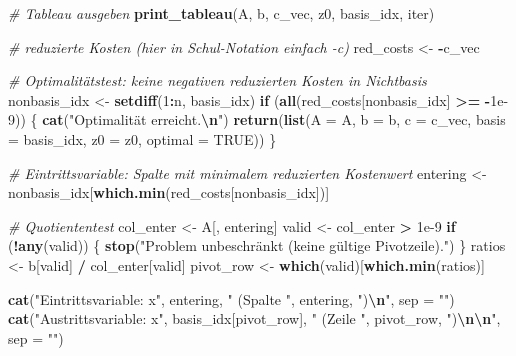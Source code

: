 \documentclass[
]{article}
\newenvironment{Shaded}{\begin{snugshade}}{\end{snugshade}}
\newcommand{\AttributeTok}[1]{\textcolor[rgb]{0.13,0.29,0.53}{#1}}
\newcommand{\CommentTok}[1]{\textcolor[rgb]{0.56,0.35,0.01}{\textit{#1}}}
\newcommand{\ConstantTok}[1]{\textcolor[rgb]{0.56,0.35,0.01}{#1}}
\newcommand{\ControlFlowTok}[1]{\textcolor[rgb]{0.13,0.29,0.53}{\textbf{#1}}}
\newcommand{\DecValTok}[1]{\textcolor[rgb]{0.00,0.00,0.81}{#1}}
\newcommand{\FloatTok}[1]{\textcolor[rgb]{0.00,0.00,0.81}{#1}}
\newcommand{\FunctionTok}[1]{\textcolor[rgb]{0.13,0.29,0.53}{\textbf{#1}}}
\newcommand{\NormalTok}[1]{#1}
\newcommand{\OtherTok}[1]{\textcolor[rgb]{0.56,0.35,0.01}{#1}}
\newcommand{\SpecialCharTok}[1]{\textcolor[rgb]{0.81,0.36,0.00}{\textbf{#1}}}
\newcommand{\StringTok}[1]{\textcolor[rgb]{0.31,0.60,0.02}{#1}}
\begin{document}
\begin{Shaded}
\begin{Highlighting}[]
  \CommentTok{\# Tableau ausgeben}
  \FunctionTok{print\_tableau}\NormalTok{(A, b, c\_vec, z0, basis\_idx, iter)}

  \CommentTok{\# reduzierte Kosten (hier in Schul{-}Notation einfach {-}c)}
\NormalTok{  red\_costs }\OtherTok{\textless{}{-}} \SpecialCharTok{{-}}\NormalTok{c\_vec}

  \CommentTok{\# Optimalitätstest: keine negativen reduzierten Kosten in Nichtbasis}
\NormalTok{  nonbasis\_idx }\OtherTok{\textless{}{-}} \FunctionTok{setdiff}\NormalTok{(}\DecValTok{1}\SpecialCharTok{:}\NormalTok{n, basis\_idx)}
  \ControlFlowTok{if}\NormalTok{ (}\FunctionTok{all}\NormalTok{(red\_costs[nonbasis\_idx] }\SpecialCharTok{\textgreater{}=} \SpecialCharTok{{-}}\FloatTok{1e{-}9}\NormalTok{)) \{}
    \FunctionTok{cat}\NormalTok{(}\StringTok{"Optimalität erreicht.}\SpecialCharTok{\textbackslash{}n}\StringTok{"}\NormalTok{)}
    \FunctionTok{return}\NormalTok{(}\FunctionTok{list}\NormalTok{(}\AttributeTok{A =}\NormalTok{ A, }\AttributeTok{b =}\NormalTok{ b, }\AttributeTok{c =}\NormalTok{ c\_vec, }\AttributeTok{basis =}\NormalTok{ basis\_idx, }\AttributeTok{z0 =}\NormalTok{ z0,}
                \AttributeTok{optimal =} \ConstantTok{TRUE}\NormalTok{))}
\NormalTok{  \}}

  \CommentTok{\# Eintrittsvariable: Spalte mit minimalem reduzierten Kostenwert}
\NormalTok{  entering }\OtherTok{\textless{}{-}}\NormalTok{ nonbasis\_idx[}\FunctionTok{which.min}\NormalTok{(red\_costs[nonbasis\_idx])]}

  \CommentTok{\# Quotiententest}
\NormalTok{  col\_enter }\OtherTok{\textless{}{-}}\NormalTok{ A[, entering]}
\NormalTok{  valid }\OtherTok{\textless{}{-}}\NormalTok{ col\_enter }\SpecialCharTok{\textgreater{}} \FloatTok{1e{-}9}
  \ControlFlowTok{if}\NormalTok{ (}\SpecialCharTok{!}\FunctionTok{any}\NormalTok{(valid)) \{}
    \FunctionTok{stop}\NormalTok{(}\StringTok{"Problem unbeschränkt (keine gültige Pivotzeile)."}\NormalTok{)}
\NormalTok{  \}}
\NormalTok{  ratios }\OtherTok{\textless{}{-}}\NormalTok{ b[valid] }\SpecialCharTok{/}\NormalTok{ col\_enter[valid]}
\NormalTok{  pivot\_row }\OtherTok{\textless{}{-}} \FunctionTok{which}\NormalTok{(valid)[}\FunctionTok{which.min}\NormalTok{(ratios)]}

  \FunctionTok{cat}\NormalTok{(}\StringTok{"Eintrittsvariable: x"}\NormalTok{, entering,}
      \StringTok{"  (Spalte "}\NormalTok{, entering, }\StringTok{")}\SpecialCharTok{\textbackslash{}n}\StringTok{"}\NormalTok{, }\AttributeTok{sep =} \StringTok{""}\NormalTok{)}
  \FunctionTok{cat}\NormalTok{(}\StringTok{"Austrittsvariable: x"}\NormalTok{, basis\_idx[pivot\_row],}
      \StringTok{"  (Zeile "}\NormalTok{, pivot\_row, }\StringTok{")}\SpecialCharTok{\textbackslash{}n\textbackslash{}n}\StringTok{"}\NormalTok{, }\AttributeTok{sep =} \StringTok{""}\NormalTok{)}


\end{Highlighting}
\end{Shaded}
\end{document}
